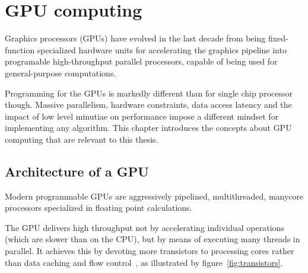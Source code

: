 \chapter{GPU computing}
\label{ch:gpu-computing}


Graphics processors (GPUs) have evolved in the last decade
from being fixed-function specialized hardware units
for accelerating the graphics pipeline
into programable high-throughput parallel processors,
capable of being used for general-purpose computations.

Programming for the GPUs is markedly different
than for single chip processor though.
Massive parallelism,
hardware constraints,
data access latency and
the impact of low level minutiae on performance
impose a different mindset for implementing any algorithm.
This chapter introduces the concepts
about GPU computing that are relevant to this thesis.

\section{Architecture of a GPU}

Modern programmable GPUs are aggressively pipelined,
multithreaded, manycore processors
specialized in floating point calculations.

The GPU delivers high throughput not by accelerating individual operations
(which are slower than on the CPU),
but by means of executing many threads in parallel.
It achieves this by devoting more transistors to processing cores
rather than data caching and flow control~\cite[\S1]{cudaprog2},
as illustrated by figure~\ref{fig:transistors}.

